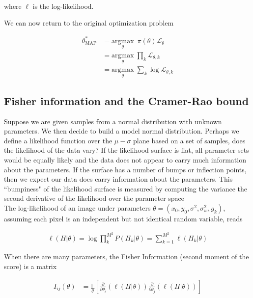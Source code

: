 \documentclass{ucetd}
\begin{document}
where $\ell$ is the log-likelihood. 

We can now return to the original optimization problem 

\begin{align*}
\theta^{*}_{\mathrm{MAP}} &= \underset{\theta}{\mathrm{argmax}} \;\ \pi(\theta)\mathcal{L}_{\theta}\\
&= \underset{\theta}{\mathrm{argmax}} \; \prod_{k}\mathcal{L}_{\theta,k}\\
&= \underset{\theta}{\mathrm{argmax}} \; \sum_{k}\log \mathcal{L}_{\theta,k}
\end{align*}


\subsection{Fisher information and the Cramer-Rao bound}

Suppose we are given samples from a normal distribution with unknown parameters. We then decide to build a model normal distribution. Perhaps we define a likelihood function over the $\mu-\sigma$ plane based on a set of samples, does the likelihood of the data vary? If the likelihood surface is flat, all parameter sets would be equally likely and the data does not appear to carry much information about the parameters. If the surface has a number of bumps or inflection points, then we expect our data does carry information about the parameters. This ``bumpiness" of the likelihood surface is measured by computing the variance the second derivative of the likelihood over the parameter space\\

\vspace{0.2in}
The log-likelihood of an image under parameters $\theta = (x_{0},y_{0},\sigma^{2},\sigma_{w}^{2},g_{k})$, assuming each pixel is an independent but not identical random variable, reads

\begin{align*}
\ell(H|\theta) = \log\prod_{k}^{M^{2}} P(H_{k}|\theta) = \sum_{k=1}^{M^{2}} \ell (H_{k}|\theta)
\end{align*}


When there are many parameters, the Fisher Information (second moment of the score) is a matrix

\begin{align*}
I_{ij}(\theta) &= \underset{\theta}{\mathbb{E}}\left[\frac{\partial}{\partial\theta_{i}} \left(\ell(H|\theta)\right)\frac{\partial}{\partial\theta_{j}} \left(\ell(H|\theta)\right)\right]\\
\end{align*}
\end{document}
